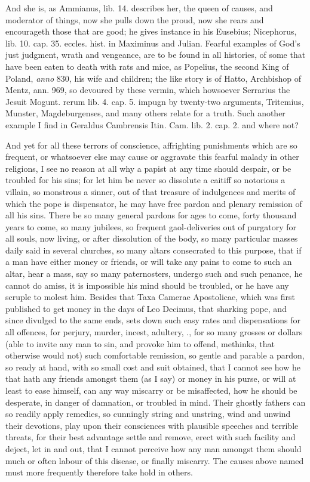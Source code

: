 {And she is, as Ammianus, lib. 14. describes her, the queen of
causes, and moderator of things, now she pulls down the proud, now she
rears and encourageth those that are good; he gives instance in his
Eusebius; Nicephorus, lib. 10. cap. 35. eccles. hist. in Maximinus and
Julian. Fearful examples of God's just judgment, wrath and vengeance,
are to be found in all histories, of some that have been eaten to death
with rats and mice, as Popelius, the second King of Poland, \emph{anno}
830, his wife and children; the like story is of Hatto, Archbishop of
Mentz, ann. 969, so devoured by these vermin, which howsoever Serrarius
the Jesuit Mogunt. rerum lib. 4. cap. 5. impugn by twenty-two
arguments, Tritemius, Munster, Magdeburgenses, and many others
relate for a truth. Such another example I find in Geraldus Cambrensis
Itin. Cam. lib. 2. cap. 2. and where not?

And yet for all these terrors of conscience, affrighting punishments
which are so frequent, or whatsoever else may cause or aggravate this
fearful malady in other religions, I see no reason at all why a papist
at any time should despair, or be troubled for his sins; for let him be
never so dissolute a caitiff so notorious a villain, so monstrous a
sinner, out of that treasure of indulgences and merits of which the
pope is dispensator, he may have free pardon and plenary remission of
all his sins. There be so many general pardons for ages to come, forty
thousand years to come, so many jubilees, so frequent gaol-deliveries
out of purgatory for all souls, now living, or after dissolution of the
body, so many particular masses daily said in several churches, so many
altars consecrated to this purpose, that if a man have either money or
friends, or will take any pains to come to such an altar, hear a mass,
say so many paternosters, undergo such and such penance, he cannot do
amiss, it is impossible his mind should be troubled, or he have any
scruple to molest him. Besides that Taxa Camerae Apostolicae, which was
first published to get money in the days of Leo Decimus, that sharking
pope, and since divulged to the same ends, sets down such easy rates
and dispensations for all offences, for perjury, murder, incest,
adultery, \etc{}., for so many grosses or dollars (able to invite any man
to sin, and provoke him to offend, methinks, that otherwise would not)
such comfortable remission, so gentle and parable a pardon, so ready at
hand, with so small cost and suit obtained, that I cannot see how he
that hath any friends amongst them (as I say) or money in his purse, or
will at least to ease himself, can any way miscarry or be misaffected,
how he should be desperate, in danger of damnation, or troubled in
mind. Their ghostly fathers can so readily apply remedies, so cunningly
string and unstring, wind and unwind their devotions, play upon their
consciences with plausible speeches and terrible threats, for their
best advantage settle and remove, erect with such facility and deject,
let in and out, that I cannot perceive how any man amongst them should
much or often labour of this disease, or finally miscarry. The causes
above named must more frequently therefore take hold in others.

}
